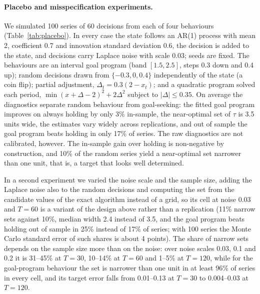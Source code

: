 \documentclass[pdflatex,sn-basic]{sn-jnl}
\theoremstyle{thmstyleone}\newtheorem{proposition}{Proposition}\newtheorem{theorem}{Theorem}
\theoremstyle{thmstylethree}\newtheorem{remark}{Remark}
\begin{document}
\paragraph{Placebo and misspecification experiments.} We simulated 100 series of 60 decisions from each of four behaviours (Table~\ref{tab:placebo}). In every case the state follows an AR(1) process with mean 2, coefficient 0.7 and innovation standard deviation 0.6, the decision is added to the state, and decisions carry Laplace noise with scale 0.03; seeds are fixed. The behaviours are an interval goal program (band $[1.5,2.5]$, steps 0.3 down and 0.4 up); random decisions drawn from $\{-0.3,0,0.4\}$ independently of the state (a coin flip); partial adjustment, $\Delta_t=0.3(2-x_t)$; and a quadratic program solved each period, $\min(x+\Delta-2)^2+2\Delta^2$ subject to $|\Delta|\le0.35$. On average the diagnostics separate random behaviour from goal-seeking: the fitted goal program improves on always holding by only 3\% in-sample, the near-optimal set of $\tau$ is 3.5 units wide, the estimates vary widely across replications, and out of sample the goal program beats holding in only 17\% of series. The raw diagnostics are not calibrated, however. The in-sample gain over holding is non-negative by construction, and 10\% of the random series yield a near-optimal set narrower than one unit, that is, a target that looks well determined.

In a second experiment we varied the noise scale and the sample size, adding the Laplace noise also to the random decisions and computing the set from the candidate values of the exact algorithm instead of a grid, so its cell at noise 0.03 and $T=60$ is a variant of the design above rather than a replication (11\% narrow sets against 10\%, median width 2.4 instead of 3.5, and the goal program beats holding out of sample in 25\% instead of 17\% of series; with 100 series the Monte Carlo standard error of such shares is about 4 points). The share of narrow sets depends on the sample size more than on the noise: over noise scales 0.03, 0.1 and 0.2 it is 31--45\% at $T=30$, 10--14\% at $T=60$ and 1--5\% at $T=120$, while for the goal-program behaviour the set is narrower than one unit in at least 96\% of series in every cell, and its target error falls from 0.01--0.13 at $T=30$ to 0.004--0.03 at $T=120$.
\end{document}

